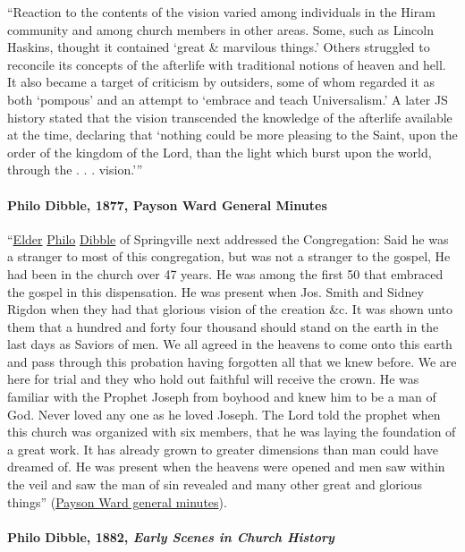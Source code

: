 			``Reaction to the contents of the vision varied among individuals in the Hiram community and among church members in other areas. Some, such as Lincoln Haskins, thought it contained `great \& marvilous things.' Others struggled to reconcile its concepts of the afterlife with traditional notions of heaven and hell. It also became a target of criticism by outsiders, some of whom regarded it as both `pompous' and an attempt to `embrace and teach Universalism.' A later JS history stated that the vision transcended the knowledge of the afterlife available at the time, declaring that `nothing could be more pleasing to the Saint, upon the order of the kingdom of the Lord, than the light which burst upon the world, through the . . . vision.'''
			
		\paragraph{Philo Dibble, 1877, Payson Ward General Minutes}
			
			``\uline{Elder} \uline{Philo} \uline{Dibble} of Springville next addressed the Congregation: Said he was a stranger to most of this congregation, but was not a stranger to the gospel, He had been in the church over 47 years. He was among the first 50 that embraced the gospel in this dispensation. He was present when Jos. Smith and Sidney Rigdon when they had that glorious vision of the creation \&c. It was shown unto them that a hundred and forty four thousand should stand on the earth in the last days as Saviors of men. We all agreed in the heavens to come onto this earth and pass through this probation having forgotten all that we knew before. We are here for trial and they who hold out faithful will receive the crown. He was familiar with the Prophet Joseph from boyhood and knew him to be a man of God. Never loved any one as he loved Joseph. The Lord told the prophet when this church was organized with six members, that he was laying the foundation of a great work. It has already grown to greater dimensions than man could have dreamed of. He was present when the heavens were opened and men saw within the veil and saw the man of sin revealed and many other great and glorious things'' (\hyperref[EMS-1877-PD-7-JAN-1877]{Payson Ward general minutes}).
			
		\paragraph{Philo Dibble, 1882, \textit{Early Scenes in Church History}}
		
